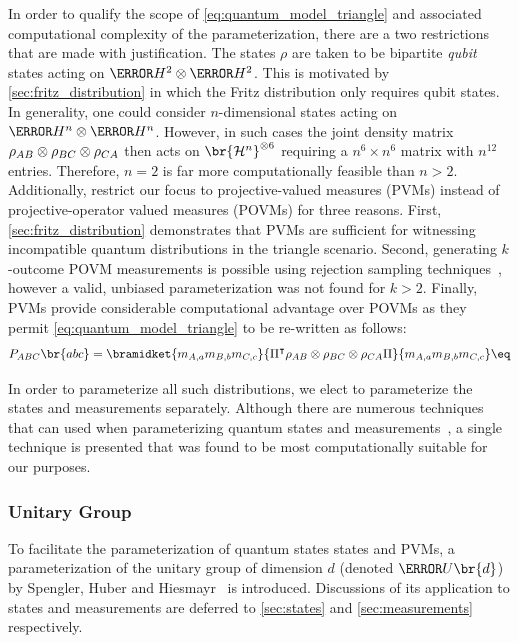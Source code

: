 \documentclass[aps, 10pt, english, twoside, pra, nofootinbib, tightenlines, longbibliography]{revtex4-1}
\begin{document}
    In order to qualify the scope of \cref{eq:quantum_model_triangle} and associated computational complexity of the parameterization, there are a two restrictions that are made with justification. The states $\rho$ are taken to be bipartite \textit{qubit} states acting on $\s{H}^{2} \otimes \s{H}^{2}$. This is motivated by \cref{sec:fritz_distribution} in which the Fritz distribution only requires qubit states. In generality, one could consider $n$-dimensional states acting on $\s{H}^{n} \otimes \s{H}^{n}$. However, in such cases the joint density matrix $\rho_{AB}\otimes\rho_{BC}\otimes\rho_{CA}$ then acts on $\br{\Hilb^{n}}^{\otimes 6}$ requiring a $n^6 \times n^6$ matrix with $n^{12}$ entries. Therefore, $n = 2$ is far more computationally feasible than $n > 2$. Additionally, restrict our focus to projective-valued measures (PVMs) instead of projective-operator valued measures (POVMs) for three reasons. First, \cref{sec:fritz_distribution} demonstrates that PVMs are sufficient for witnessing incompatible quantum distributions in the triangle scenario. Second, generating $k$-outcome POVM measurements is possible using rejection sampling techniques~\cite{Petz_2015}, however a valid, unbiased parameterization was not found for $k > 2$. Finally, PVMs provide considerable computational advantage over POVMs as they permit \cref{eq:quantum_model_triangle} to be re-written as follows:
    \[ \prob[\p{ABC}]\br{abc} = \bramidket{m_{\p{A},a}m_{\p{B},b}m_{\p{C},c}}{\netperm^\intercal \rho_{AB}\otimes\rho_{BC}\otimes\rho_{CA} \netperm}{m_{\p{A},a}m_{\p{B},b}m_{\p{C},c}} \eq \label{eq:quantum_model_triangle_pvms}\]

    In order to parameterize all such distributions, we elect to parameterize the states and measurements separately. Although there are numerous techniques that can used when parameterizing quantum states and measurements~\cite{Petz_2015, Hedemann_2013,Fujii_2005,James_2001,Grasmair_2014,Neilsen_Chaung_2011}, a single technique is presented that was found to be most computationally suitable for our purposes.
    \subsubsection{Unitary Group}
    \label{sec:unitary_group}
    To facilitate the parameterization of quantum states states and PVMs, a parameterization of the unitary group of dimension $d$ (denoted $\s{U}\br{d}$) by Spengler, Huber and Hiesmayr~\cite{Spengler_2010_Unitary} is introduced. Discussions of its application to states and measurements are deferred to \cref{sec:states} and \cref{sec:measurements} respectively.
\end{document}
